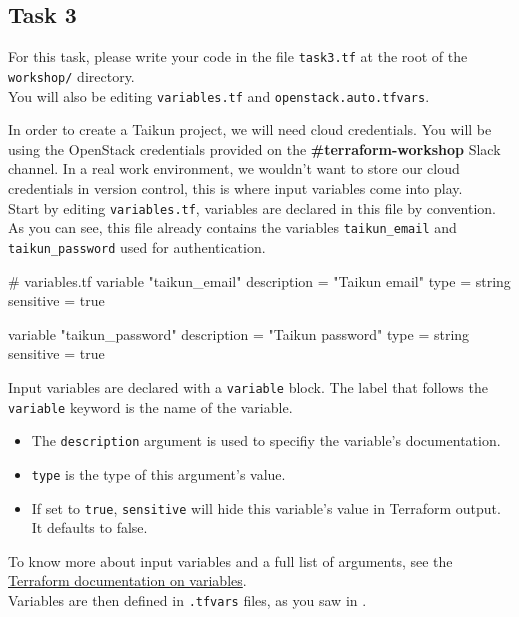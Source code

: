 \subsection{Task 3}\label{sec:task3}

\begin{note}
For this task, please write your code in the file \texttt{task3.tf}
at the root of the \texttt{workshop/} directory.\\
You will also be editing \texttt{variables.tf} and \texttt{openstack.auto.tfvars}.
\end{note}

In order to create a Taikun project, we will need cloud credentials.
You will be using the OpenStack credentials provided on the \textbf{\#terraform-workshop}
Slack channel. In a real work environment, we wouldn't want to store our cloud credentials in version control,
this is where input variables come into play.\\

Start by editing \texttt{variables.tf}, variables are declared in this file by convention.
As you can see, this file already contains the variables \texttt{taikun\_email} and
\texttt{taikun\_password} used for authentication.

\begin{tf}
# variables.tf
variable "taikun_email" {
  description = "Taikun email"
  type        = string
  sensitive   = true
}

variable "taikun_password" {
  description = "Taikun password"
  type        = string
  sensitive   = true
}
\end{tf}

\begin{tip}
  Input variables are declared with a \texttt{variable} block.
  The label that follows the \texttt{variable} keyword is the name of the variable.

  \begin{itemize}
    \item The \texttt{description} argument is used to specifiy the variable's documentation.
    \item \texttt{type} is the type of this argument's value.
    \item If set to \texttt{true}, \texttt{sensitive} will hide this variable's value in Terraform output. It defaults to false.
  \end{itemize}

  To know more about input variables and a full list of arguments,
  see the \href{https://www.terraform.io/docs/language/values/variables.html}{Terraform documentation on variables}.\\

  Variables are then defined in \texttt{.tfvars} files, as you saw in .\\
\end{tip}

